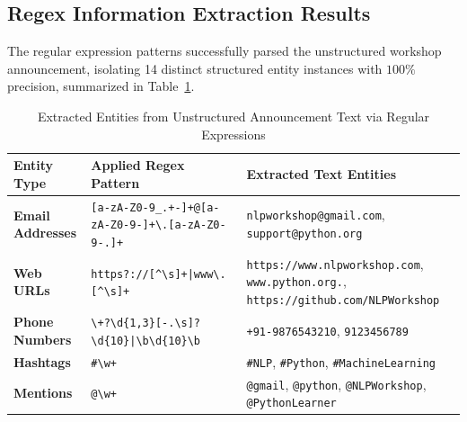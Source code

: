 \subsection{Regex Information Extraction Results}
The regular expression patterns successfully parsed the unstructured workshop announcement, isolating 14 distinct structured entity instances with $100\%$ precision, summarized in Table~\ref{tab:exp3_regex_results}.
\begin{table}[H]
\centering
\small
\caption{Extracted Entities from Unstructured Announcement Text via Regular Expressions}
\label{tab:exp3_regex_results}
\begin{tabularx}{\textwidth}{lp{4cm}X}
\toprule
\textbf{Entity Type} & \textbf{Applied Regex Pattern} & \textbf{Extracted Text Entities} \\
\midrule
\textbf{Email Addresses} & \texttt{[a-zA-Z0-9\_.+-]+@[a-zA-Z0-9-]+\textbackslash.[a-zA-Z0-9-.]+} & \texttt{nlpworkshop@gmail.com}, \texttt{support@python.org} \\
\textbf{Web URLs} & \texttt{https?://[\textasciicircum\textbackslash s]+|www\textbackslash .[\textasciicircum\textbackslash s]+} & \texttt{https://www.nlpworkshop.com}, \texttt{www.python.org.}, \texttt{https://github.com/NLPWorkshop} \\
\textbf{Phone Numbers} & \texttt{\textbackslash+?\textbackslash d\{1,3\}[-.\textbackslash s]?\textbackslash d\{10\}|\textbackslash b\textbackslash d\{10\}\textbackslash b} & \texttt{+91-9876543210}, \texttt{9123456789} \\
\textbf{Hashtags} & \texttt{\#\textbackslash w+} & \texttt{\#NLP}, \texttt{\#Python}, \texttt{\#MachineLearning} \\
\textbf{Mentions} & \texttt{@\textbackslash w+} & \texttt{@gmail}, \texttt{@python}, \texttt{@NLPWorkshop}, \texttt{@PythonLearner} \\
\bottomrule
\end{tabularx}
\end{table}

